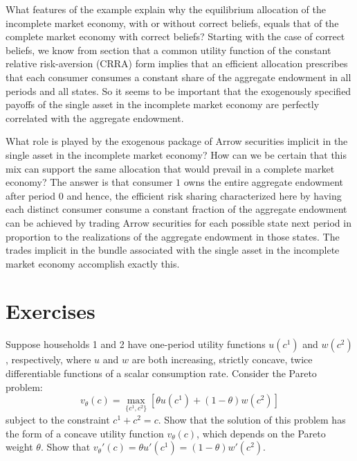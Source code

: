 What features of the example explain why the equilibrium
allocation of the incomplete market economy, with or without
correct beliefs, equals that of the complete market economy
with correct beliefs? Starting with the case of correct beliefs, we
know from section 
that  a common utility
function of the constant relative risk-aversion (CRRA) form
implies that an efficient allocation prescribes that each
 consumer consumes a constant share of the aggregate endowment
in all periods and all states. So it seems to be important
that the exogenously specified payoffs of the single asset in the
incomplete market economy are perfectly correlated with the
aggregate endowment.

What  role is played by the exogenous package  of
Arrow securities implicit in the single asset in the
incomplete market economy?  How can we be certain that this mix
can support the same  allocation that would prevail in  a complete
market economy? The answer is that consumer $1$ owns the entire
aggregate endowment after period $0$ and hence, the efficient
risk sharing  characterized here by having each distinct consumer
consume a constant fraction of the aggregate endowment can be achieved
by trading Arrow securities for each possible
state next period in proportion to the realizations of the
aggregate endowment in those states.  The  trades implicit in
  the  bundle
associated with the single asset in the incomplete market economy accomplish exactly this.



























\showchaptIDfalse \showsectIDfalse
\section{Exercises}
\showchaptIDtrue \showsectIDtrue
\medskip
\medskip
{}
\medskip
\noindent Suppose households 1 and 2 have one-period utility
functions $u(c^1)$ and $w(c^2)$, respectively, where $u$ and $w$
are both increasing, strictly concave, twice differentiable
functions of a scalar consumption rate.  Consider the Pareto
problem:
 $$v_\theta(c) = \max_{\{c^1, c^2\}} \left[ \theta u(c^1)
   + (1-\theta) w(c^2) \right]$$ subject to
the constraint $c^1 + c^2 = c$.  Show that the solution of this
problem has the form of a concave utility function $v_\theta(c)$,
which depends on the Pareto weight $\theta$. Show that
$v_\theta'(c) = \theta u'(c^1) = (1-\theta) w'(c^2)$.

